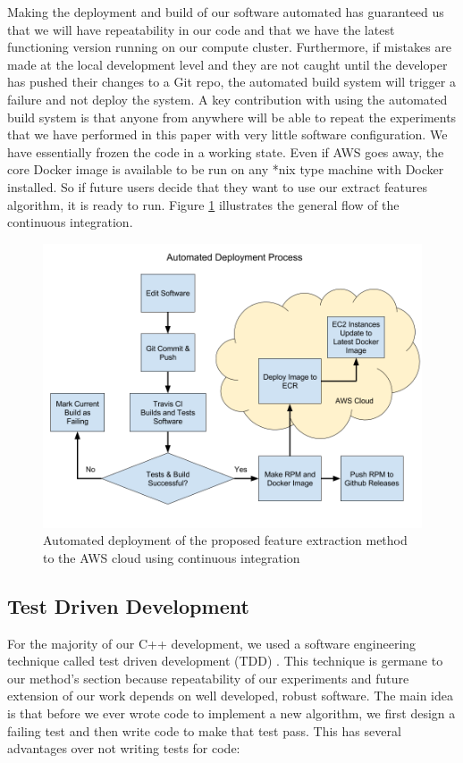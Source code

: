 Making the deployment and build of our software automated has guaranteed us
that we will have repeatability in our code and that we have the latest
functioning version running on our compute cluster. Furthermore, if mistakes are
made at the local development level and they are not caught until the developer
has pushed their changes to a Git repo, the automated build system will trigger
a failure and not deploy the system. A key contribution with using the automated
build system is that anyone from anywhere will be able to repeat the experiments
that we have performed in this paper with very little software configuration. We
have essentially frozen the code in a working state. Even if AWS goes away, the
core Docker image is available to be run on any *nix type machine with Docker installed.
So if future users decide that they want to use our extract features algorithm,
it is ready to run. Figure \ref{fig:continuous_integration} illustrates the
general flow of the continuous integration.

\begin{figure}[h]
  \label{fig:continuous_integration}
  \centering
  \includegraphics[width=\textwidth]{figures/continuous_integration}
  \caption{Automated deployment of the proposed feature extraction method to
  the AWS cloud using continuous integration}
\end{figure}

\subsection{\label{subsection:tdd}Test Driven Development}
For the majority of our C++ development, we used a software engineering technique
called test driven development (TDD) \cite{beck2003test}. This technique is germane to
our method's section because repeatability of our experiments and future
extension of our work depends on well developed, robust software. The main idea is that
before we ever wrote code to implement a new algorithm, we first design a failing
test and then write code to make that test pass. This has several advantages over
not writing tests for code:

